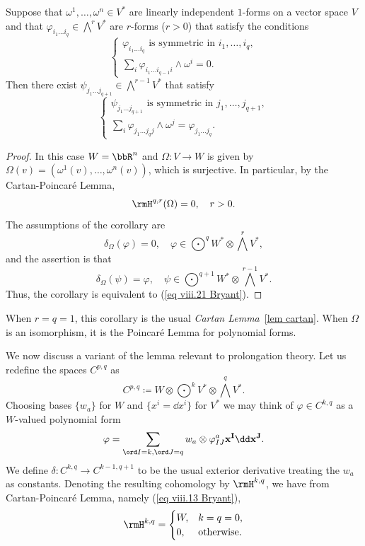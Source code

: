 \begin{cor}
    Suppose that $\omega^1,\ldots,\omega^n\in V^\ast$ are linearly independent $1$-forms on a vector space $V$ and that $\varphi_{i_1\ldots i_q}\in \bigwedge^r V^\ast$ are $r$-forms ($r>0$) that satisfy the conditions 
    \[\left\{
        \begin{array}{l}
            \varphi_{i_1\ldots i_q} \text{ is symmetric in }i_1,\ldots,i_q,\\
            \sum_i \varphi_{i_1\ldots i_{q-1} i}\wedge \omega^i=0.
        \end{array}
    \right.\]
    Then there exist $\psi_{j_1\ldots j_{q+1}}\in \bigwedge^{r-1}V^\ast$ that satisfy 
    \[\left\{
        \begin{array}{l}
            \psi_{j_1\ldots j_{q+1}} \text{ is symmetric in }j_1,\ldots,j_{q+1},\\
            \sum_i \varphi_{j_1\ldots j_q j}\wedge \omega^j=\varphi_{j_1\ldots j_q}.
        \end{array}
    \right.\]
\end{cor}
\begin{proof}
    In this case $W=\bbR^n$ and $\Omega:V\to W$ is given by $\Omega(v)=(\omega^1(v),\ldots,\omega^n(v))$, which is surjective. In particular, by the Cartan-Poincar\'e Lemma,
    \[\rmH^{q,r}(\Omega)=0,\quad r>0.\label{eq viii.21 Bryant}\]
    The assumptions of the corollary are 
    \[\delta_\Omega(\varphi)=0,\quad \varphi\in \bigodot^q W^\ast\otimes \bigwedge^r V^\ast,\]
    and the assertion is that 
    \[\delta_\Omega (\psi)=\varphi,\quad \psi\in \bigodot^{q+1}W^\ast\otimes \bigwedge^{r-1}V^\ast.\]
    Thus, the corollary is equivalent to (\ref{eq viii.21 Bryant}).
\end{proof}

When $r=q=1$, this corollary is the usual \emph{Cartan Lemma}~\ref{lem cartan}. When $\Omega$ is an isomorphism, it is the Poincar\'e Lemma for polynomial forms.

We now discuss a variant of the lemma relevant to prolongation theory. Let us redefine the spaces $C^{p,q}$ as 
\[C^{p,q}\coloneqq W\otimes \bigodot^k V^\ast\otimes \bigwedge^q V^\ast.\]
Choosing bases $\{w_a\}$ for $W$ and $\{x^i=\dd x^i\}$ for $V^\ast$ we may think of $\varphi\in C^{k,q}$ as a $W$-valued polynomial form 
\[\varphi=\sum_{\ord I=k,\ord J=q}w_a\otimes \varphi^a_{IJ}\bf{x}^I \dd \bf{x}^J.\]
We define $\delta:C^{k,q}\to C^{k-1,q+1}$ to be the usual exterior derivative treating the $w_a$ as constants. Denoting the resulting cohomology by $\rmH^{k,q}$, we have from Cartan-Poincar\'e Lemma, namely (\ref{eq viii.13 Bryant}), 
\[\rmH^{k,q}=\begin{cases}
    W,& k=q=0,\\
    0, & \text{otherwise}.
\end{cases}\]

